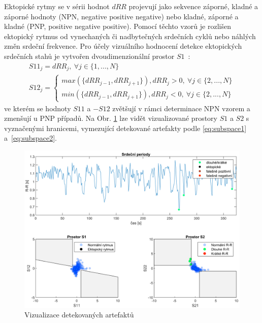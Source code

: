 Ektopické rytmy se v sérii hodnot $dRR$ projevují jako sekvence záporné, kladné
a záporné hodnoty (NPN, negative positive negative) nebo kladné, záporné a
kladné (PNP, positive negative positive). Pomocí těchto vzorů je rozlišen
ektopický rytmus od vynechaných či nadbytečných srdečních cyklů nebo náhlých
změn srdeční frekvence. Pro účely vizuálního hodnocení detekce ektopických
srdečních stahů je vytvořen dvoudimenzionální prostor $S1$~\cite{Lipponen2019}:
\begin{gather}
    S11_j = dRR_j, ~\forall j \in \{1,...,N\} \nonumber \\
    S12_j =
    \begin{cases}
        max(\{dRR_{j-1}, dRR_{j+1}\}), dRR_j > 0, ~\forall j \in \{2,...,N\} \\
        min(\{dRR_{j-1}, dRR_{j+1}\}), dRR_j < 0, ~\forall j \in \{2,...,N\}
    \end{cases}
    \label{eq:subspace1}
\end{gather}
ve kterém se hodnoty $S11$ a $-S12$ zvětšují v rámci determinace NPN vzorem a
zmenšují u PNP případů. Na Obr. \ref{fig:rr_process} lze vidět vizualizované
prostory $S1$ a $S2$ s vyznačenými hranicemi, vymezující detekované artefakty
podle \eqref{eq:subspace1} a~\eqref{eq:subspace2}.

\begin{figure}[h]
    \begin{center}
        \includegraphics[width=1\textwidth]{../assets/figures/rr_process}
        \caption{Vizualizace detekovaných artefaktů}
        \label{fig:rr_process}
    \end{center}
\end{figure}

